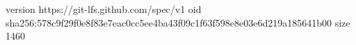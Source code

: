 version https://git-lfs.github.com/spec/v1
oid sha256:578c9f29f0e8f83e7eac0cc5ee4ba43f09c1f63f598e8e03e6d219a185641b00
size 1460
